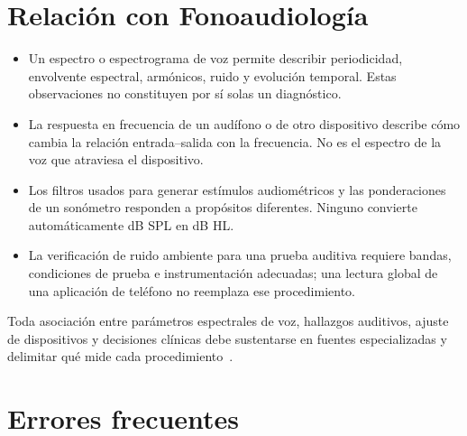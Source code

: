 \section{Relación con Fonoaudiología}
\label{sec:u5-relacion-fonoaudiologia}

\begin{itemize}
    \item Un espectro o espectrograma de voz permite describir periodicidad,
    envolvente espectral, armónicos, ruido y evolución temporal. Estas
    observaciones no constituyen por sí solas un diagnóstico.
    \item La respuesta en frecuencia de un audífono o de otro dispositivo
    describe cómo cambia la relación entrada--salida con la frecuencia. No es
    el espectro de la voz que atraviesa el dispositivo.
    \item Los filtros usados para generar estímulos audiométricos y las
    ponderaciones de un sonómetro responden a propósitos diferentes. Ninguno
    convierte automáticamente dB SPL en dB HL.
    \item La verificación de ruido ambiente para una prueba auditiva requiere
    bandas, condiciones de prueba e instrumentación adecuadas; una lectura
    global de una aplicación de teléfono no reemplaza ese procedimiento.
\end{itemize}

Toda asociación entre parámetros espectrales de voz, hallazgos
auditivos, ajuste de dispositivos y decisiones clínicas debe sustentarse en
fuentes especializadas y delimitar qué mide cada procedimiento~\cite{brockmann2011}.

\section{Errores frecuentes}
\label{sec:u5-errores-frecuentes}

